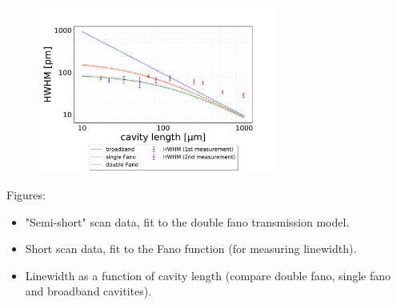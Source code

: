 \begin{figure}[h!]
    \centering
    \includegraphics[width=0.7\textwidth]{figures/results/HWHM_vs_cavity_length_result.pdf}
    \caption{}
    \label{fig:HWHM_vs_l_double_fano_result}
\end{figure}

Figures: 
\begin{itemize}
    \item "Semi-short" scan data, fit to the double fano transmission model. 
    \item Short scan data, fit to the Fano function (for measuring linewidth).
    \item Linewidth as a function of cavity length (compare double fano, single fano and broadband cavitites).
\end{itemize}

